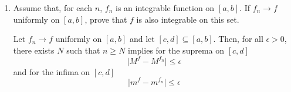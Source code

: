 \begin{enumerate}
\begin{proof}
\begin{enumerate}
        \item We observe that, from (b), on \( [0,1] \) we have that \( f(x) = x \) admits
        \[
            U(f,P_n) - L(f,P_n) = \frac{n+1}{2n} - \frac{n-1}{2n} = \frac{1}{n}
        \]
        and thus
        \[
        \lim_{n \rightarrow \infty} U(f,P_n) - L(f,P_n) = \lim_{n \rightarrow \infty} \frac{1}{n} = 0
        \]
        Therefore, \( f(x) = x \) is integrable on \( [0,1] \)
    \end{enumerate}
    \end{proof}
    
    \item Assume that, for each \( n \), \( f_n \) is an integrable function on \( [a,b] \). If \( f_n \rightarrow f \) uniformly on \( [a,b] \), prove that \( f \) is also integrable on this set.
    
    \begin{lemma}
    Let \( f_n \rightarrow f \) uniformly on \( [a,b] \) and let \( [c,d] \subseteq [a,b] \). Then, for all \( \epsilon > 0 \), there exists \( N \) such that \( n \geq N \) implies for the suprema on \( [c,d] \)
    \[
    \vert M^f - M^{f_n} \vert \leq \epsilon
    \]
    and for the infima on \( [c,d] \)
    \[
    \vert m^f - m^{f_n} \vert \leq \epsilon
    \]
    \end{lemma}
    

\end{enumerate}
